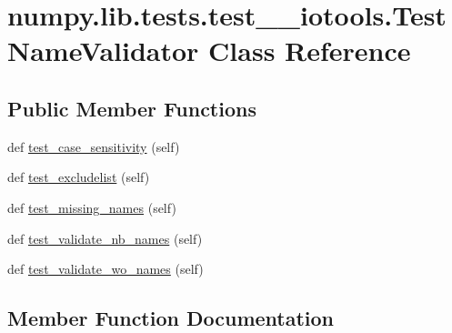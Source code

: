 \hypertarget{classnumpy_1_1lib_1_1tests_1_1test____iotools_1_1TestNameValidator}{}\section{numpy.\+lib.\+tests.\+test\+\_\+\+\_\+iotools.\+Test\+Name\+Validator Class Reference}
\label{classnumpy_1_1lib_1_1tests_1_1test____iotools_1_1TestNameValidator}
\subsection*{Public Member Functions}
\begin{DoxyCompactItemize}
\item 
def \hyperlink{classnumpy_1_1lib_1_1tests_1_1test____iotools_1_1TestNameValidator_a59c64c4752f13edf85ea83cfde0815f1}{test\+\_\+case\+\_\+sensitivity} (self)
\item 
def \hyperlink{classnumpy_1_1lib_1_1tests_1_1test____iotools_1_1TestNameValidator_a8d7e2caf15716f2fbf7c281815fd3748}{test\+\_\+excludelist} (self)
\item 
def \hyperlink{classnumpy_1_1lib_1_1tests_1_1test____iotools_1_1TestNameValidator_aa87ed3515a0fdeb0b8c59a3b2baa7cf9}{test\+\_\+missing\+\_\+names} (self)
\item 
def \hyperlink{classnumpy_1_1lib_1_1tests_1_1test____iotools_1_1TestNameValidator_aab8910da1be65ca7fcda2d654b1be628}{test\+\_\+validate\+\_\+nb\+\_\+names} (self)
\item 
def \hyperlink{classnumpy_1_1lib_1_1tests_1_1test____iotools_1_1TestNameValidator_afb0883a9323d67c519f064801a4d4d21}{test\+\_\+validate\+\_\+wo\+\_\+names} (self)
\end{DoxyCompactItemize}


\subsection{Member Function Documentation}
\mbox{\label{classnumpy_1_1lib_1_1tests_1_1test____iotools_1_1TestNameValidator_a59c64c4752f13edf85ea83cfde0815f1}} 
